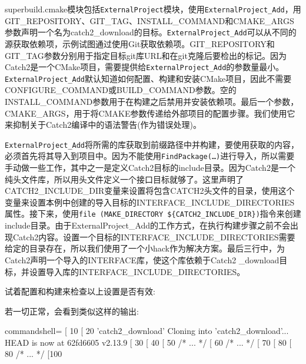 superbuild.cmake模块包括\texttt{ExternalProject}模块，使用\texttt{ExternalProject\_Add}，用GIT\_REPOSITORY、GIT\_TAG、INSTALL\_COMMAND和CMAKE\_ARGS参数声明一个名为catch2\_download的目标。\texttt{ExternalProject\_Add}可以从不同的源获取依赖项，示例试图通过使用Git获取依赖项。GIT\_REPOSITORY和GIT\_TAG参数分别用于指定目标git库URL和在git克隆后要检出的标记。因为Catch2是一个CMake项目，需要提供给\texttt{ExternalProject\_Add}的参数量最小。\texttt{ExternalProject\_Add}默认知道如何配置、构建和安装CMake项目，因此不需要CONFIGURE\_COMMAND或BUILD\_COMMAND参数。空的INSTALL\_COMMAND参数用于在构建之后禁用并安装依赖项。最后一个参数，CMAKE\_ARGS，用于将CMAKE参数传递给外部项目的配置步骤。我们使用它来抑制关于Catch2编译中的语法警告(作为错误处理)。

\texttt{ExternalProject\_Add}将所需的库获取到前缀路径中并构建，要使用获取的内容，必须首先将其导入到项目中。因为不能使用\texttt{FindPackage(…)}进行导入，所以需要手动做一些工作，其中之一是定义Catch2目标的include目录。因为Catch2是一个纯头文件库，所以用头文件定义一个接口目标就够了。这里声明了CATCH2\_INCLUDE\_DIR变量来设置将包含CATCH2头文件的目录，使用这个变量来设置本例中创建的导入目标的INTERFACE\_INCLUDE\_DIRECTORIES属性。接下来，使用\texttt{file (MAKE\_DIRECTORY \$\{CATCH2\_INCLUDE\_DIR\})}指令来创建include目录。由于ExternalProject\_Add的工作方式，在执行构建步骤之前不会出现Catch2内容。设置一个目标的INTERFACE\_INCLUDE\_DIRECTORIES需要给定的目录存在，所以我们使用了一个小hack作为解决方案。最后三行中，为Catch2声明一个导入的INTERFACE库，使这个库依赖于Catch2 \_download目标，并设置导入库的INTERFACE\_INCLUDE\_DIRECTORIES。

试着配置和构建来检查以上设置是否有效:


若一切正常，会看到类似这样的输出:

\begin{tcblisting}{commandshell={}}
[ 10%
[ 20%
  'catch2_download'
Cloning into 'catch2_download'...
HEAD is now at 62fd6605 v2.13.9
[ 30%
[ 40%
[ 50%
/* ... */
[ 60%
/* ... */
[ 70%
[ 80%
[ 80%
/* ... */
[100%
\end{tcblisting}

